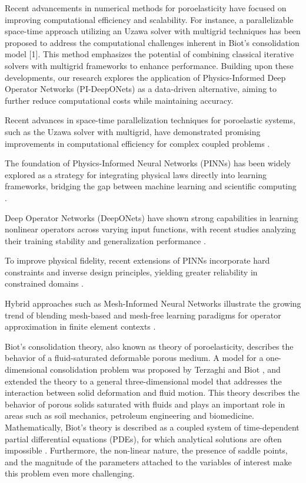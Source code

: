 \documentclass[sn-mathphys]{sn-jnl}%
\theoremstyle{thmstyleone}%
\theoremstyle{thmstyletwo}%
\theoremstyle{thmstylethree}%
\begin{document}
Recent advancements in numerical methods for poroelasticity have focused on improving computational efficiency and scalability. For instance, a parallelizable space-time approach utilizing an Uzawa solver with multigrid techniques has been proposed to address the computational challenges inherent in Biot’s consolidation model [1]. This method emphasizes the potential of combining classical iterative solvers with multigrid frameworks to enhance performance. Building upon these developments, our research explores the application of Physics-Informed Deep Operator Networks (PI-DeepONets) as a data-driven alternative, aiming to further reduce computational costs while maintaining accuracy.

Recent advances in space-time parallelization techniques for poroelastic systems, such as the Uzawa solver with multigrid, have demonstrated promising improvements in computational efficiency for complex coupled problems \cite{daSilva2025uzawa}.

The foundation of Physics-Informed Neural Networks (PINNs) has been widely explored as a strategy for integrating physical laws directly into learning frameworks, bridging the gap between machine learning and scientific computing \cite{raissi2022scientific}.

Deep Operator Networks (DeepONets) have shown strong capabilities in learning nonlinear operators across varying input functions, with recent studies analyzing their training stability and generalization performance \cite{li2024training}.

To improve physical fidelity, recent extensions of PINNs incorporate hard constraints and inverse design principles, yielding greater reliability in constrained domains \cite{lu2021physics}.

Hybrid approaches such as Mesh-Informed Neural Networks illustrate the growing trend of blending mesh-based and mesh-free learning paradigms for operator approximation in finite element contexts \cite{franco2023mesh}.


Biot's consolidation theory, also known as theory of poroelasticity, describes the behavior of a fluid-saturated deformable porous medium. A model for a one-dimensional consolidation problem was proposed by Terzaghi \cite{terzaghi1943} and Biot \cite{biot1941general}, and extended the theory to a general three-dimensional model that addresses the interaction between solid deformation and fluid motion. This theory describes the behavior of porous solids saturated with fluids and plays an important role in areas such as soil mechanics, petroleum engineering and biomedicine. Mathematically, Biot's theory is described as a coupled system of time-dependent partial differential equations (PDEs), for which analytical solutions are often impossible \cite{burden2011numerical}. Furthermore, the non-linear nature, the presence of saddle points, and the magnitude of the parameters attached to the variables of interest make this problem even more challenging.
\end{document}
